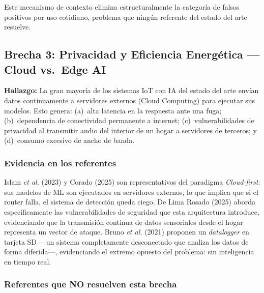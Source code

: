 \documentclass[12pt,a4paper]{article}
\begin{document}
\noindent Este mecanismo de contexto elimina estructuralmente la categoría de falsos
positivos por uso cotidiano, problema que ningún referente del estado del arte resuelve.

\subsection{Brecha 3: Privacidad y Eficiencia Energética --- Cloud vs.\ Edge AI}

\begin{mdframed}[linecolor=accentpurple,linewidth=1pt,backgroundcolor=violet!3]
\textbf{Hallazgo:} La gran mayoría de los sistemas IoT con IA del estado del arte envían
datos continuamente a servidores externos (Cloud Computing) para ejecutar sus modelos.
Esto genera: (a)~alta latencia en la respuesta ante una fuga; (b)~dependencia de
conectividad permanente a internet; (c)~vulnerabilidades de privacidad al transmitir
audio del interior de un hogar a servidores de terceros; y (d)~consumo excesivo de ancho
de banda.
\end{mdframed}

\vspace{0.6em}

\subsubsection{Evidencia en los referentes}

Islam \textit{et al.} (2023) y Corado (2025) son representativos del paradigma
\textit{Cloud-first}: sus modelos de ML son ejecutados en servidores externos, lo que
implica que si el router falla, el sistema de detección queda ciego. De Lima Rosado
(2025) aborda específicamente las vulnerabilidades de seguridad que esta arquitectura
introduce, evidenciando que la transmisión continua de datos sensoriales desde el hogar
representa un vector de ataque. Bruno \textit{et al.} (2021) proponen un
\textit{datalogger} en tarjeta SD ---un sistema completamente desconectado que analiza
los datos de forma diferida---, evidenciando el extremo opuesto del problema: sin
inteligencia en tiempo real.

\subsubsection{Referentes que NO resuelven esta brecha}
\end{document}
